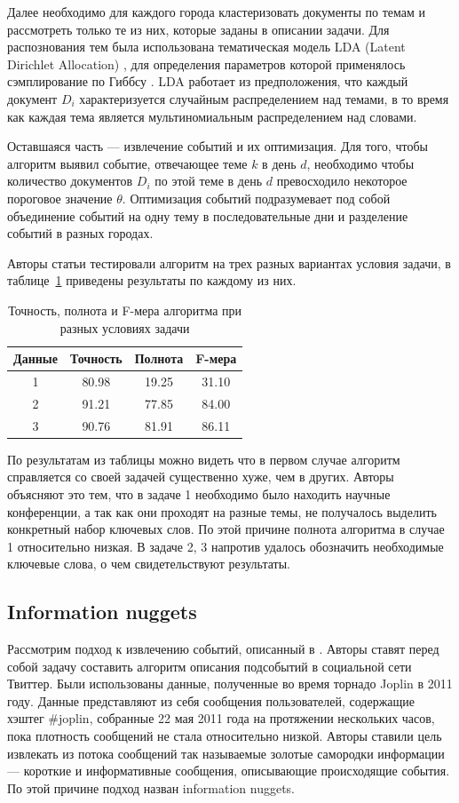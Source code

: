 \documentclass[14pt,a4paper,oneside]{extarticle}
\begin{document}
	Далее необходимо для каждого города кластеризовать документы по темам и рассмотреть только те из них, которые заданы в описании задачи. Для распознования тем была использована тематическая модель LDA (Latent Dirichlet Allocation) \cite{lda-model}, для определения параметров которой применялось сэмплирование по Гиббсу \cite{lda-gibbs}. LDA работает из предположения, что каждый документ $D_i$ характеризуется случайным распределением над темами, в то время как каждая тема является мультиномиальным распределением над словами.
	
	Оставшаяся часть --- извлечение событий и их оптимизация. Для того, чтобы алгоритм выявил событие, отвечающее теме $k$ в день $d$, необходимо чтобы количество документов $D_i$ по этой теме в день $d$ превосходило некоторое пороговое значение $\theta$. Оптимизация событий подразумевает под собой объединение событий на одну тему в последовательные дни и разделение событий в разных городах.
	
	Авторы статьи тестировали алгоритм на трех разных вариантах условия задачи, в таблице~\ref{lda-table} приведены результаты по каждому из них.
	
\begin{table}[h]
	\centering
	\caption{Точность, полнота и F-мера алгоритма при разных условиях задачи}
    \begin{tabular}{c c c c}
    Данные & Точность & Полнота & F-мера \\ \hline
    1 & 80.98 & 19.25 & 31.10 \\ 
    2 & 91.21 & 77.85 & 84.00  \\ 
    3 & 90.76 & 81.91 & 86.11 \\ \hline
    \end{tabular}
    \label{lda-table}
\end{table}

	По результатам из таблицы можно видеть что в первом случае алгоритм справляется со своей задачей существенно хуже, чем в других. Авторы объясняют это тем, что в задаче 1 необходимо было находить научные конференции, а так как они проходят на разные темы, не получалось выделить конкретный набор ключевых слов. По этой причине полнота алгоритма в случае 1 относительно низкая. В задаче 2, 3 напротив удалось обозначить необходимые ключевые слова, о чем свидетельствуют результаты.
	
	\subsection{Information nuggets}
	Рассмотрим подход к извлечению событий, описанный в \cite{nuggets}. Авторы ставят перед собой задачу составить алгоритм описания подсобытий в социальной сети Твиттер. Были использованы данные, полученные во время торнадо Joplin в 2011 году. Данные представляют из себя сообщения пользователей, содержащие хэштег \#joplin, собранные 22 мая 2011 года на протяжении нескольких часов, пока плотность сообщений не стала относительно низкой. Авторы ставили цель извлекать из потока сообщений так называемые золотые самородки информации --- короткие и информативные сообщения, описывающие происходящие события. По этой причине подход назван information nuggets.
	
\end{document}
